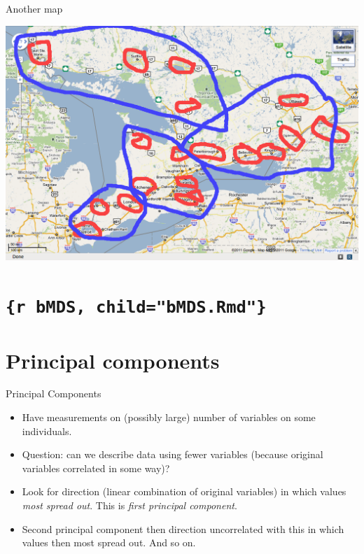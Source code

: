 \documentclass[ignorenonframetext,]{beamer}
\begin{document}
\begin{frame}{Another map}
\protect\hypertarget{another-map}{}

\includegraphics{map2.png}

\end{frame}

\hypertarget{r-bmds-childbmds.rmd}{%
\section{\texorpdfstring{\texttt{\{r\ bMDS,\ child="bMDS.Rmd"\}}}{\{r bMDS, child="bMDS.Rmd"\}}}\label{r-bmds-childbmds.rmd}}

\hypertarget{principal-components}{%
\section{Principal components}\label{principal-components}}

\begin{frame}{Principal Components}
\protect\hypertarget{principal-components-1}{}

\begin{itemize}
\item
  Have measurements on (possibly large) number of variables on some
  individuals.
\item
  Question: can we describe data using fewer variables (because original
  variables correlated in some way)?
\item
  Look for direction (linear combination of original variables) in which
  values \emph{most spread out}. This is \emph{first principal
  component}.
\item
  Second principal component then direction uncorrelated with this in
  which values then most spread out. And so on.
\end{itemize}

\end{frame}
\end{document}
